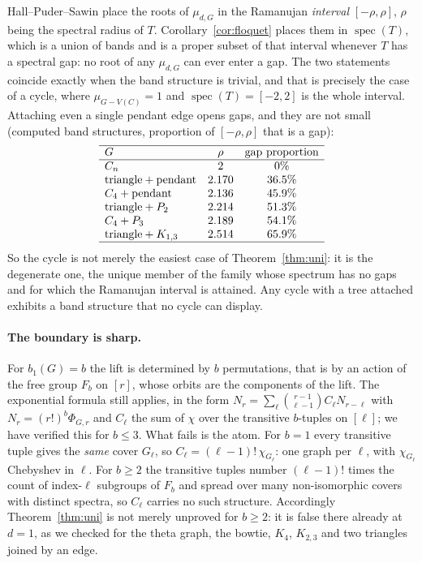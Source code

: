 \documentclass[11pt]{article}
\theoremstyle{remark}
\begin{document}
Hall--Puder--Sawin place the roots of $\mu_{d,G}$ in the Ramanujan
\emph{interval} $[-\rho,\rho]$, $\rho$ being the spectral radius of $T$.
Corollary~\ref{cor:floquet} places them in $\operatorname{spec}(T)$, which is a
union of bands and is a proper subset of that interval whenever $T$ has a
spectral gap: no root of any $\mu_{d,G}$ can ever enter a gap. The two
statements coincide exactly when the band structure is trivial, and that is
precisely the case of a cycle, where $\mu_{G-V(C)}=1$ and
$\operatorname{spec}(T)=[-2,2]$ is the whole interval. Attaching even a single
pendant edge opens gaps, and they are not small (computed band structures,
proportion of $[-\rho,\rho]$ that is a gap):
\[
\begin{array}{lcc}
\hline
G & \rho & \text{gap proportion}\\
\hline
C_n & 2 & 0\%\\
\text{triangle}+\text{pendant} & 2.170 & 36.5\%\\
C_4+\text{pendant} & 2.136 & 45.9\%\\
\text{triangle}+P_2 & 2.214 & 51.3\%\\
C_4+P_3 & 2.189 & 54.1\%\\
\text{triangle}+K_{1,3} & 2.514 & 65.9\%\\
\hline
\end{array}
\]
So the cycle is not merely the easiest case of Theorem~\ref{thm:uni}: it is the
degenerate one, the unique member of the family whose spectrum has no gaps and
for which the Ramanujan interval is attained. Any cycle with a tree attached
exhibits a band structure that no cycle can display.

\paragraph{The boundary is sharp.}
For $b_1(G)=b$ the lift is determined by $b$ permutations, that is by an action
of the free group $F_b$ on $[r]$, whose orbits are the components of the lift.
The exponential formula still applies, in the form
$N_r=\sum_{\ell}\binom{r-1}{\ell-1}C_\ell N_{r-\ell}$ with
$N_r=(r!)^{b}\Phi_{G,r}$ and $C_\ell$ the sum of $\chi$ over the transitive
$b$-tuples on $[\ell]$; we have verified this for $b\le3$. What fails is the
atom. For $b=1$ every transitive tuple gives the \emph{same} cover $G_\ell$, so
$C_\ell=(\ell-1)!\,\chi_{G_\ell}$: one graph per $\ell$, with $\chi_{G_\ell}$
Chebyshev in $\ell$. For $b\ge2$ the transitive tuples number $(\ell-1)!$ times
the count of index-$\ell$ subgroups of $F_b$ and spread over many
non-isomorphic covers with distinct spectra, so $C_\ell$ carries no such
structure. Accordingly Theorem~\ref{thm:uni} is not merely unproved for
$b\ge2$: it is false there already at $d=1$, as we checked for the theta graph,
the bowtie, $K_4$, $K_{2,3}$ and two triangles joined by an edge.
\end{document}
